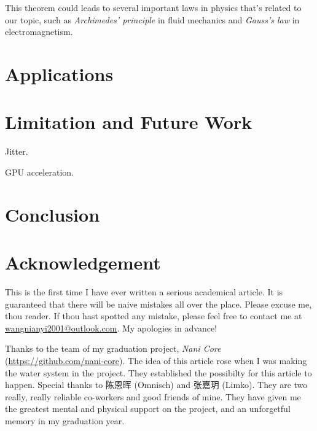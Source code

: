 \documentclass{article}
\begin{document}
This theorem could leads to several important laws in physics that's related to our topic, such as \emph{Archimedes' principle} in fluid mechanics and \emph{Gauss's law} in electromagnetism.

\section{Applications}

\section{Limitation and Future Work}

Jitter.

GPU acceleration.

\section{Conclusion}

\section*{Acknowledgement}

This is the first time I have ever written a serious academical article.
It is guaranteed that there will be naive mistakes all over the place.
Please excuse me, thou reader.
If thou hast spotted any mistake, please feel free to contact me at \url{wangnianyi2001@outlook.com}.
My apologies in advance!

Thanks to the team of my graduation project, \emph{Nani Core} (\url{https://github.com/nani-core}).
The idea of this article rose when I was making the water system in the project.
They established the possibilty for this article to happen.
Special thanks to 陈恩晖 (Omnisch) and 张嘉玥 (Limko).
They are two really, really reliable co-workers and good friends of mine.
They have given me the greatest mental and physical support on the project, and an unforgetful memory in my graduation year.


\printbibliography
\end{document}
